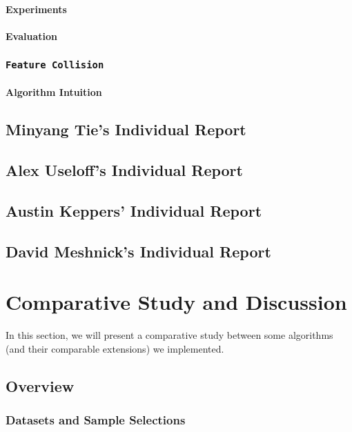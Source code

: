 \documentclass[11pt]{article}
\newcommand{\ilc}{\texttt}
\begin{document}
\paragraph{Experiments}
\paragraph{Evaluation}


\subsubsection{\ilc{Feature Collision}}
\paragraph{Algorithm Intuition}


\subsection{Minyang Tie's Individual Report}


\subsection{Alex Useloff's Individual Report}


\subsection{Austin Keppers' Individual Report}


\subsection{David Meshnick's Individual Report}

\section{Comparative Study and Discussion}

In this section, we will present a comparative study between some algorithms (and their comparable extensions) we implemented.

\subsection{Overview}

\subsubsection{Datasets and Sample Selections}
\end{document}
